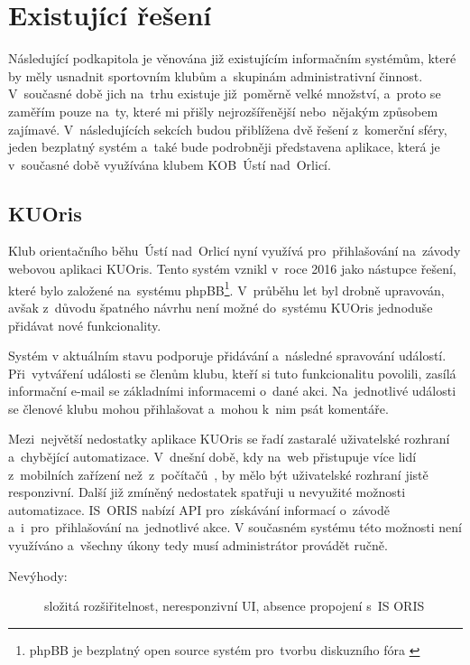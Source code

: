 \section{Existující řešení}
Následující podkapitola je věnována již existujícím informačním systémům, které by měly usnadnit sportovním klubům a~skupinám administrativní činnost. V~současné době jich na~trhu existuje již~poměrně velké množství, a~proto se zaměřím pouze na~ty, které mi přišly nejrozšířenější nebo~nějakým způsobem zajímavé. V~následujících sekcích budou přiblížena dvě řešení z~komerční sféry, jeden bezplatný systém a~také bude podrobněji představena aplikace, která je v~současné době využívána klubem KOB~Ústí nad~Orlicí.

\subsection{KUOris}
\label{section:kuoris}
Klub orientačního běhu~Ústí nad~Orlicí nyní využívá pro~přihlašování na~závody webovou aplikaci KUOris. Tento systém vznikl v~roce 2016 jako nástupce řešení, které bylo založené na~systému phpBB\footnote{phpBB je bezplatný open source systém pro~tvorbu diskuzního fóra \cite{phpbb}}. V~průběhu let byl drobně upravován, avšak z~důvodu špatného návrhu není možné do~systému KUOris jednoduše přidávat nové funkcionality.

Systém v aktuálním stavu podporuje přidávání a~následné spravování událostí. Při~vytváření události se členům klubu, kteří si tuto funkcionalitu povolili, zasílá informační e-mail se základními informacemi o~dané akci. Na~jednotlivé události se členové klubu mohou přihlašovat a~mohou k~nim psát komentáře.

Mezi~největší nedostatky aplikace KUOris se řadí zastaralé uživatelské rozhraní a~chybějící automatizace. V~dnešní době, kdy na~web přistupuje více lidí z~mobilních zařízení než~z~počítačů~\cite{deviceusage}, by mělo být uživatelské rozhraní jistě responzivní. Další již zmíněný nedostatek spatřuji u nevyužité možnosti automatizace. IS~ORIS nabízí API pro~získávání informací o~závodě a~i~pro~přihlašování na~jednotlivé akce. V současném systému této možnosti není využíváno a~všechny úkony tedy musí administrátor provádět ručně.

\begin{description}
	\item[Nevýhody:] složitá rozšiřitelnost, neresponzivní UI, absence propojení s~IS ORIS
\end{description}

